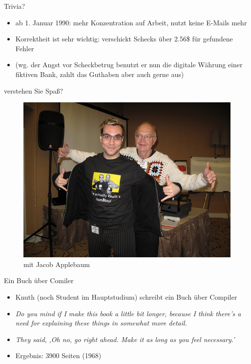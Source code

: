 \begin{frame}{Trivia?}

\begin{itemize}
\itemsep1pt\parskip0pt
\item
  ab 1. Januar 1990: mehr Konzentration auf Arbeit, nutzt keine E-Mails
  mehr
\item
  Korrektheit ist sehr wichtig: verschickt Schecks über 2.56\$ für
  gefundene Fehler
\item
  (wg. der Angst vor Scheckbetrug benutzt er nun die digitale Währung
  einer fiktiven Bank, zahlt das Guthaben aber auch gerne aus)
\end{itemize}

\end{frame}

\begin{frame}{verstehen Sie Spaß?}

\begin{figure}[htbp]
\centering
\includegraphics[width=\textwidth*0.8,height=\textheight*0.8,keepaspectratio]{../../img/knuth-applebaum.jpg}
\caption{mit Jacob Applebaum}
\end{figure}

\end{frame}

\begin{frame}{Ein Buch über Comiler}

\begin{itemize}
\itemsep1pt\parskip0pt
\item
    Knuth (noch Student im Hauptstudium) schreibt ein Buch über Compiler
\item
    \textit{Do you mind if I make this book a little bit longer, because I think there's a need for explaining these things in somewhat more detail.}
\item
    \textit{They said, ‚Oh no, go right ahead. Make it as long as you feel necessary.'}
\item
  Ergebnis: 3900 Seiten (1968)
\end{itemize}

\end{frame}

